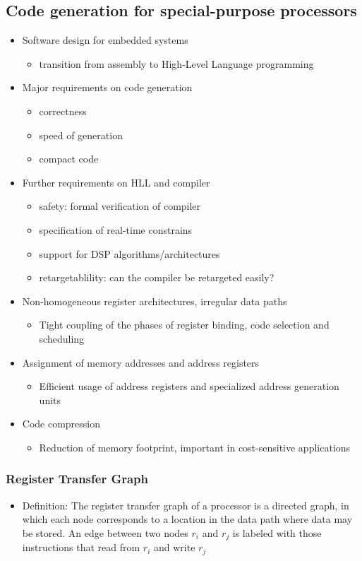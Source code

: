 \subsection{Code generation for special-purpose processors}
\begin{itemize}
	\item Software design for embedded systems
\begin{itemize}
	\item transition from assembly to High-Level Language programming
\end{itemize}
	\item Major requirements on code generation
\begin{itemize}
	\item correctness
	\item speed of generation
	\item compact code
\end{itemize}
	\item Further requirements on HLL and compiler
\begin{itemize}
	\item safety: formal verification of compiler
	\item specification of real-time constrains
	\item support for DSP algorithms/architectures
	\item retargetablility: can the compiler be retargeted easily?  
\end{itemize}
	\item Non-homogeneous register architectures, irregular data paths
\begin{itemize}
	\item Tight coupling of the phases of register binding, code selection and scheduling
\end{itemize}
	\item Assignment of memory addresses and address registers
\begin{itemize}
	\item Efficient usage of address registers and specialized address generation units
\end{itemize}
	\item Code compression
\begin{itemize}
	\item Reduction of memory footprint, important in cost-sensitive applications
\end{itemize}
\end{itemize}

\subsubsection{Register Transfer Graph}
\begin{itemize}
	\item Definition: The register transfer graph of a processor is a directed graph, in which each node corresponds to a location in the data path where data may be stored. An edge between two nodes $r_i$ and $r_j$ is labeled with those instructions that read from $r_i$ and write $r_j$
\end{itemize}


